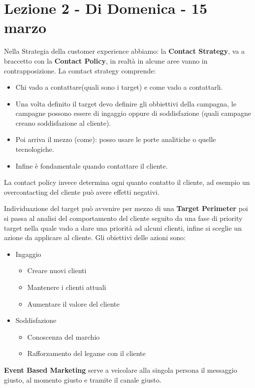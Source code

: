 \documentclass[11pt]{article}
\begin{document}
\section{Lezione 2 - Di Domenica - 15 marzo} %

Nella Strategia della customer experience abbiamo: la \textbf{Contact Strategy}, va a braccetto con la \textbf{Contact Policy}, in realtà in alcune aree vanno in contrapposizione. La comtact strategy comprende:
\begin{itemize}[noitemsep,topsep=0ex]
	\item Chi vado a contattare(quali sono i target) e come vado a contattarli. 
	\item Una volta definito il target devo definire gli obbiettivi della campagna, le campagne possono essere di ingaggio oppure di soddisfazione (quali campagne creano soddisfazione al cliente). 
	\item Poi arriva il mezzo (come): posso usare le porte analitiche o quelle tecnologiche.
	\item Infine è fondamentale quando contattare il cliente.
\end{itemize} 
La contact policy invece determina ogni quanto contatto il cliente, ad esempio un overcontacting del cliente può avere effetti negativi.

Individuazione del target può avvenire per mezzo di una \textbf{Target Perimeter} poi si passa al analisi del comportamento del cliente seguito da una fase di priority target nella quale vado a dare una priorità ad alcuni clienti, infine si sceglie un azione da applicare al cliente.
Gli obiettivi delle azioni sono:
\begin{itemize}[noitemsep,topsep=0ex]
	\item Ingaggio
	\begin{itemize}[noitemsep,topsep=0ex]
		\item Creare nuovi clienti
		\item Mantenere i clienti attuali
		\item Aumentare il valore del cliente
	\end{itemize}
	\item Soddisfazione
	\begin{itemize}[noitemsep,topsep=0ex]
		\item Conoscenza del marchio
		\item Rafforzamento del legame con il cliente
	\end{itemize}
\end{itemize}
\textbf{Event Based Marketing} serve a veicolare alla singola persona il messaggio giusto, al momento giusto e tramite il canale giusto.
\end{document}
